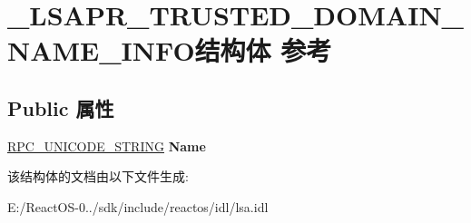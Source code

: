 \hypertarget{struct___l_s_a_p_r___t_r_u_s_t_e_d___d_o_m_a_i_n___n_a_m_e___i_n_f_o}{}\section{\+\_\+\+L\+S\+A\+P\+R\+\_\+\+T\+R\+U\+S\+T\+E\+D\+\_\+\+D\+O\+M\+A\+I\+N\+\_\+\+N\+A\+M\+E\+\_\+\+I\+N\+F\+O结构体 参考}
\label{struct___l_s_a_p_r___t_r_u_s_t_e_d___d_o_m_a_i_n___n_a_m_e___i_n_f_o}
\subsection*{Public 属性}
\begin{DoxyCompactItemize}
\item 
\mbox{\label{struct___l_s_a_p_r___t_r_u_s_t_e_d___d_o_m_a_i_n___n_a_m_e___i_n_f_o_a6c8159eae8e253ec59ede6e64a0b926b}} 
\hyperlink{struct___r_p_c___u_n_i_c_o_d_e___s_t_r_i_n_g}{R\+P\+C\+\_\+\+U\+N\+I\+C\+O\+D\+E\+\_\+\+S\+T\+R\+I\+NG} {\bfseries Name}
\end{DoxyCompactItemize}


该结构体的文档由以下文件生成\+:\begin{DoxyCompactItemize}
\item 
E\+:/\+React\+O\+S-\/0../sdk/include/reactos/idl/lsa.\+idl\end{DoxyCompactItemize}
